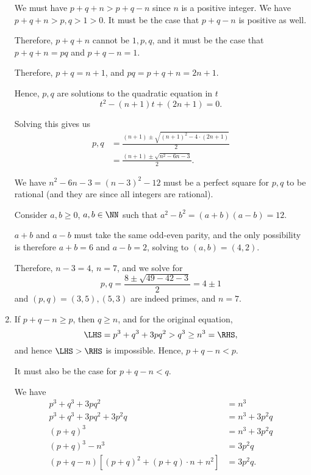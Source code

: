 \begin{enumerate}
          We must have \(p + q + n > p + q - n\) since \(n\) is a positive integer. We have \(p + q + n > p, q > 1 > 0\). It must be the case that \(p + q - n\) is positive as well.

          Therefore, \(p + q + n\) cannot be \(1, p, q\), and it must be the case that \(p + q + n = pq\) and \(p + q - n = 1\).

          Therefore, \(p + q = n + 1\), and \(pq = p + q + n = 2n + 1\).

          Hence, \(p, q\) are solutions to the quadratic equation in \(t\)
          \[
              t^2 - (n + 1)t + (2n + 1) = 0.
          \]

          Solving this gives us
          \begin{align*}
              p, q & = \frac{(n + 1) \pm \sqrt{(n + 1)^2 - 4 \cdot (2n + 1)}}{2} \\
                   & = \frac{(n + 1) \pm \sqrt{n^2 - 6n - 3}}{2}.
          \end{align*}

          We have \(n^2 - 6n - 3 = (n - 3)^2 - 12\) must be a perfect square for \(p, q\) to be rational (and they are since all integers are rational).

          Consider \(a, b \geq 0\), \(a, b \in \NN\) such that \(a^2 - b^2 = (a + b) (a - b) = 12\).

          \(a + b\) and \(a - b\) must take the same odd-even parity, and the only possibility is therefore \(a + b = 6\) and \(a - b = 2\), solving to \((a, b) = (4, 2)\).

          Therefore, \(n - 3 = 4\), \(n = 7\), and we solve for
          \[
              p, q = \frac{8 \pm \sqrt{49 - 42 - 3}}{2} = 4 \pm 1
          \]
          and \((p, q) = (3, 5), (5, 3)\) are indeed primes, and \(n = 7\).

    \item If \(p + q - n \geq p\), then \(q \geq n\), and for the original equation,
          \[
              \LHS = p^3 + q^3 + 3pq^2 > q^3 \geq n^3 = \RHS,
          \]
          and hence \(\LHS > \RHS\) is impossible. Hence, \(p + q - n < p\).

          It must also be the case for \(p + q - n < q\).

          We have
          \begin{align*}
              p^3 + q^3 + 3pq^2                                          & = n^3          \\
              p^3 + q^3 + 3pq^2 + 3p^2 q                                 & = n^3 + 3p^2 q \\
              (p + q)^3                                                  & = n^3 + 3p^2 q \\
              (p + q)^3 - n^3                                            & = 3p^2 q       \\
              (p + q - n) \left[(p + q)^2 + (p + q) \cdot n + n^2\right] & = 3p^2 q.
          \end{align*}


\end{enumerate}
